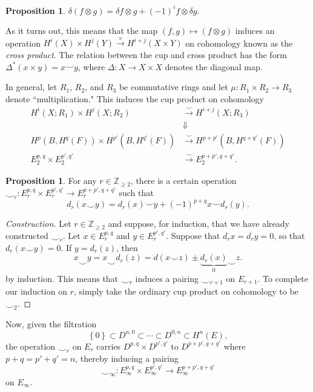 \documentclass[10pt,letterpaper,cm]{nupset}
\theoremstyle{definition}
\theoremstyle{theorem}
\newtheorem{prop}[defn]{Proposition}
\theoremstyle{remark}
\newcommand{\Z}{\mathbb Z}
\newcommand{\1}{\mathbb{1}}
\newcommand{\0}{\vec 0}
\begin{document}
\begin{prop}
$\delta(f \otimes g) = \delta{f} \otimes g + (-1)^i{f} \otimes \delta{g}$.
\end{prop}

As it turns out, this means that the map $\left(f,g\right) \mapsto \left(f \otimes g\right)$ induces an operation $H^i(X) \times H^j(Y) \overset{\times}{\longrightarrow} H^{i+j}(X\times Y)$ on cohomology known as the \textit{cross product}. The relation between the cup and cross product has the form $\Delta^{\ast}(x\times y) = x\smile y$, where $\Delta : X \to X \times X$ denotes the diagonal map.

\medskip

In general, let $R_1$, $R_2$, and $R_3$ be commutative rings and let $\mu : R_1 \times R_2 \to R_3$ denote  ``multiplication." This induces the cup product on cohomology
\begin{align*}
H^i(X; R_1)  \times H^j(X; R_2) &  \xrightarrow{\smile}H^{i+j}(X; R_3)
\\ &  \Downarrow \quad \quad \quad \quad
\\ H^p(B, H^q(F)) \times H^{p'}(B, H^{q'}(F)) &  \xrightarrow{\smile}H^{p+p'}(B, H^{q+q'}(F))
\\ E_2^{p,q} \times E_2^{p', q'} &   \xrightarrow{\smile}E_2^{p+p', q+q'}. 
\end{align*}

\begin{prop}
For any $r\in \Z_{\geq 2}$, there is a certain operation $\smile_r : E_r^{p,q} \times E_r^{p',q'} \to E_r^{p+p', q+q'}$ such that
\[
d_r(x\smile y) = d_r(x) \smile y + ({-1})^{p+q}x \smile d_r(y).
\] 
\end{prop}
\begin{proof}[Construction]
Let $r\in \Z_{\geq 2}$ and  suppose, for induction, that we have already constructed $\smile_r$. Let $x \in E_r^{p,q}$ and $y\in E_r^{p',q'}$. Suppose that $d_r{x} =d_r{y} =0$, so that $d_r(x \smile y) =0$. If $y = d_r(z)$, then 
\[
x \smile y = x \smile d_r(z) = d(x\smile z) \pm \underbrace{d_r(x)}_{0} \smile z.
\] by induction. This means that $\smile_r$ induces a pairing $\smile_{r+1}$ on $E_{r+1}$. To complete our induction on $r$, simply  take the ordinary cup product on cohomology to be $\smile_2$.
\end{proof}

Now, given the filtration
\[
\left\{0\right\} \subset D^{n,0} \subset \cdots \subset D^{0,n} \subset H^n(E),
\] the operation $\smile_r$ on $E_r$ carries $D^{p,q} \times D^{p',q'}$ to $D^{p+p', q+q'}$ where $p+q = p'+q' =n$, thereby inducing a pairing $$\smile_{\infty}: E_{\infty}^{p,q} \times E_{\infty}^{p',q'} \to E_{\infty}^{p+p', q+q'}$$
on $E_{\infty}$.
\end{document}

